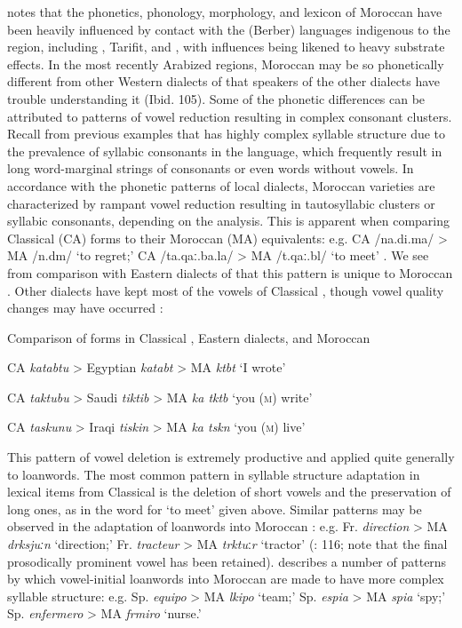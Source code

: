   \citet{Chtatou1997} notes that the phonetics, phonology, morphology, and lexicon of Moroccan  have been heavily influenced by contact with the  (Berber) languages indigenous to the region, including , Tarifit, and , with influences being likened to heavy substrate effects. In the most recently Arabized regions, Moroccan  may be so phonetically different from other Western dialects of  that speakers of the other dialects have trouble understanding it (Ibid. 105). Some of the phonetic differences can be attributed to patterns of vowel reduction resulting in complex consonant clusters. Recall from previous examples that  has highly complex syllable structure due to the prevalence of syllabic consonants in the language, which frequently result in long word-marginal strings of consonants or even words without vowels. In accordance with the phonetic patterns of local  dialects, Moroccan  varieties are characterized by rampant vowel reduction resulting in tautosyllabic clusters or syllabic consonants, depending on the analysis. This is apparent when comparing Classical  (CA) forms to their Moroccan  (MA) equivalents: e.g. CA /na.di.ma/ > MA /n.dm/ ‘to regret;’ CA /ta.qaː.ba.la/ > MA /t.qaː.bl/ ‘to meet’ \citep[110]{Chtatou1997}. We see from comparison with Eastern dialects of  that this pattern is unique to Moroccan . Other dialects have kept most of the vowels of Classical , though vowel quality changes may have occurred :

\ea\label{ex:8.5}
  Comparison of forms in Classical , Eastern dialects, and Moroccan 

  CA \textit{katabtu} > Egyptian  \textit{katabt} > MA \textit{ktbt} ‘I wrote’ 

  CA \textit{taktubu} > Saudi  \textit{tiktib} > MA \textit{ka tktb} ‘you (\textsc{m}) write’

  CA \textit{taskunu} > Iraqi  \textit{tiskin} > MA \textit{ka tskn} ‘you (\textsc{m}) live’
\citep[111-12]{Chtatou1997}
\z

This pattern of vowel deletion is extremely productive and applied quite generally to loanwords. The most common pattern in syllable structure adaptation in lexical items from Classical  is the deletion of short vowels and the preservation of long ones, as in the word for ‘to meet’ given above. Similar patterns may be observed in the adaptation of  loanwords into Moroccan : e.g. Fr. \textit{direction} > MA \textit{drksjuːn} ‘direction;’ Fr. \textit{tracteur} > MA \textit{trktu}ː\textit{r} ‘tractor’ (\citealt{Chatou1997}: 116; note that the final prosodically prominent vowel has been retained). \citet{Sayahi2005} describes a number of patterns by which vowel-initial  loanwords into Moroccan  are made to have more complex syllable structure: e.g. Sp. \textit{equipo} > MA \textit{lkipo} ‘team;’ Sp. \textit{espia} > MA \textit{spia} ‘spy;’ Sp. \textit{enfermero} > MA \textit{frmiro} ‘nurse.’

